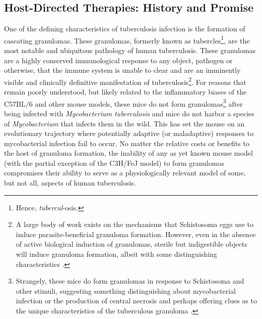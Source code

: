 \subsection{Host\hyp{}Directed Therapies: History and Promise}\label{hdt}

One of the defining characteristics of tuberculosis infection is the formation of caseating granulomas. These granulomas, formerly known as tubercles\footnote{Hence, \textit{tubercul}\hyp{}osis.}, are the most notable and ubiquitous pathology of human tuberculosis. These granulomas are a highly conserved immunological response to any object, pathogen or otherwise, that the immune system is unable to clear and are an imminently visible and clinically definitive manifestation of tuberculosis\footnote{A large body of work exists on the mechanisms that Schistosoma eggs use to induce parasite\hyp{}beneficial granuloma formation. However, even in the absence of active biological induction of granulomas, sterile but indigestible objects will induce granuloma formation, albeit with some distinguishing characteristics \citep{Boros2003}.}. For reasons that remain poorly understood, but likely related to the inflammatory biases of the C57BL/6 and other mouse models, these mice do not form granulomas\footnote{Strangely, these mice do form granulomas in response to Schistosoma and other stimuli, suggesting something distinguishing about mycobacterial infection or the production of central necrosis and perhaps offering clues as to the unique characteristics of the tuberculous granuloma \citep{Fu2012}.} after being infected with \textit{Mycobacterium tuberculosis} and mice do not harbor a species of \textit{Mycobacterium} that infects them in the wild. This has set the mouse on an evolutionary trajectory where potentially adaptive (or maladaptive) responses to mycobacterial infection fail to occur. No matter the relative costs or benefits to the host of granuloma formation, the inability of any as yet known mouse model (with the partial exception of the C3H/FeJ model) to form granulomas compromises their ability to serve as a physiologically relevant model of some, but not all, aspects of human tuberculosis.

